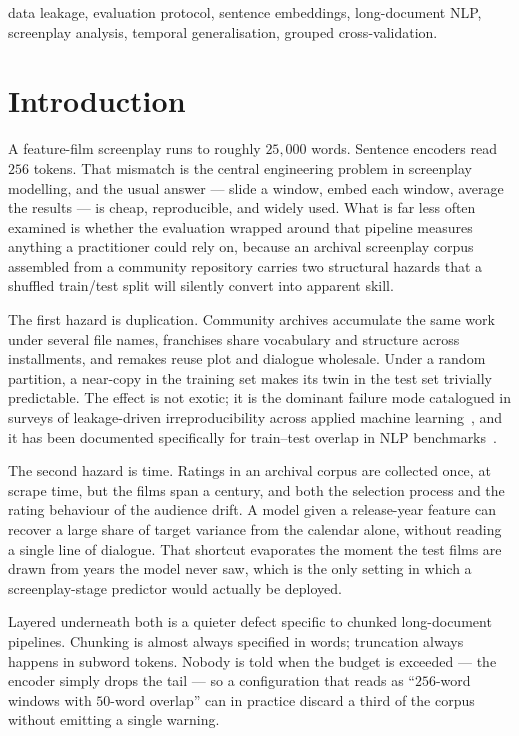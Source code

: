 \documentclass[conference,a4paper]{IEEEtran}
\begin{document}
\begin{IEEEkeywords}
data leakage, evaluation protocol, sentence embeddings, long-document
NLP, screenplay analysis, temporal generalisation, grouped
cross-validation.
\end{IEEEkeywords}

\section{Introduction}

A feature-film screenplay runs to roughly $25{,}000$ words. Sentence
encoders read $256$ tokens. That mismatch is the central engineering
problem in screenplay modelling, and the usual answer --- slide a window,
embed each window, average the results --- is cheap, reproducible, and
widely used. What is far less often examined is whether the evaluation
wrapped around that pipeline measures anything a practitioner could rely
on, because an archival screenplay corpus assembled from a community
repository carries two structural hazards that a shuffled train/test
split will silently convert into apparent skill.

The first hazard is duplication. Community archives accumulate the same
work under several file names, franchises share vocabulary and structure
across installments, and remakes reuse plot and dialogue wholesale. Under
a random partition, a near-copy in the training set makes its twin in the
test set trivially predictable. The effect is not exotic; it is the
dominant failure mode catalogued in surveys of leakage-driven
irreproducibility across applied machine learning~\cite{kapoor2023}, and
it has been documented specifically for train--test overlap in NLP
benchmarks~\cite{lewis2021,elangovan2021}.

The second hazard is time. Ratings in an archival corpus are collected
once, at scrape time, but the films span a century, and both the
selection process and the rating behaviour of the audience drift. A model
given a release-year feature can recover a large share of target variance
from the calendar alone, without reading a single line of dialogue. That
shortcut evaporates the moment the test films are drawn from years the
model never saw, which is the only setting in which a screenplay-stage
predictor would actually be deployed.

Layered underneath both is a quieter defect specific to chunked
long-document pipelines. Chunking is almost always specified in words;
truncation always happens in subword tokens. Nobody is told when the
budget is exceeded --- the encoder simply drops the tail --- so a
configuration that reads as ``$256$-word windows with $50$-word overlap''
can in practice discard a third of the corpus without emitting a single
warning.
\end{document}
